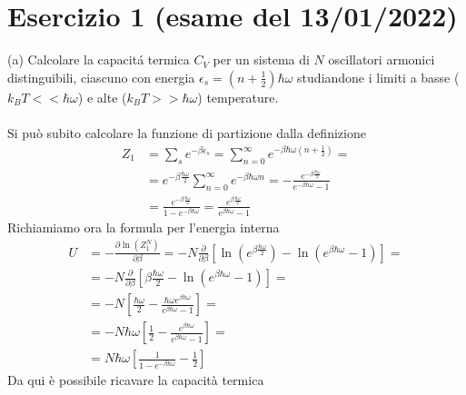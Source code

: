 \documentclass[a4paper]{article}
\begin{document}
    \section*{Esercizio 1 (esame del 13/01/2022)}
        (a) Calcolare la capacitá termica $C_V$ per un sistema di $N$ oscillatori armonici distinguibili, ciascuno con energia $\epsilon_s=\left(n+\frac{1}{2}\right)\hbar\omega$ studiandone i limiti a basse ($k_BT<<\hbar\omega$) e alte ($k_BT>>\hbar\omega$) temperature.
        \\
        \\
        Si può subito calcolare la funzione di partizione dalla definizione
        \begin{equation*}
            \begin{split}
                Z_1&=\sum_se^{-\beta\epsilon_s}=\sum_{n=0}^\infty e^{-\beta\hbar\omega\left(n+\frac{1}{2}\right)}=\\
                &=e^{-\beta\frac{\hbar\omega}{2}}\sum_{n=0}^\infty e^{-\beta\hbar\omega n}=-\frac{e^{-\beta\frac{\hbar\omega}{2}}}{e^{-\beta\hbar\omega}-1}\\
                &=\frac{e^{-\beta\frac{\hbar\omega}{2}}}{1-e^{-\beta\hbar\omega}}=\frac{e^{\beta\frac{\hbar\omega}{2}}}{e^{\beta\hbar\omega}-1}
            \end{split}
        \end{equation*}
        Richiamiamo ora la formula per l'energia interna
        \begin{equation*}
            \begin{split}
                U&=-\frac{\partial\ln(Z_1^N)}{\partial\beta}=-N\frac{\partial}{\partial\beta}\left[\ln(e^{\beta\frac{\hbar\omega}{2}})-\ln(e^{\beta\hbar\omega}-1)\right]=\\
                &=-N\frac{\partial}{\partial\beta}\left[\beta\frac{\hbar\omega}{2}-\ln(e^{\beta\hbar\omega}-1)\right]=\\
                &=-N\left[\frac{\hbar\omega}{2}-\frac{\hbar\omega e^{\beta\hbar\omega}}{e^{\beta\hbar\omega}-1}\right]=\\
                &=-N\hbar\omega\left[\frac{1}{2}-\frac{e^{\beta\hbar\omega}}{e^{\beta\hbar\omega}-1}\right]=\\
                &=N\hbar\omega\left[\frac{1}{1-e^{-\beta\hbar\omega}}-\frac{1}{2}\right]
            \end{split}
        \end{equation*}
        Da qui è possibile ricavare la capacità termica
\end{document}
